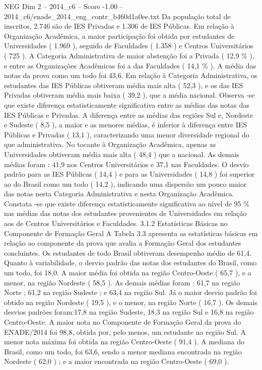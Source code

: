 \begin{textsample}{NEG Dim 2 – 2014\_c6 – Score -1.00 – 2014\_c6/enade\_2014\_eng\_contr\_b460d1a0ee.txt}
Da população total de inscritos, 2.746 são de IES Privadas e 1.306 de IES Públicas.
Em relação à Organização Acadêmica, a maior participação foi obtida por estudantes de Universidades ( 1.969 ), seguido de Faculdades ( 1.358 ) e Centros Universitários ( 725 ).
A Categoria Administrativa de maior abstenção foi a Privada ( 12,9 \% ), e entre as Organizações Acadêmicas foi a das Faculdades ( 14,1 \% ).
A média das notas da prova como um todo foi 43,6.
Em relação à Categoria Administrativa, os estudantes das IES Públicas obtiveram média mais alta ( 52,3 ), e os das IES Privadas obtiveram média mais baixa ( 39,2 ), que a média nacional.
Observa -se que existe diferença estatisticamente significativa entre as médias das notas das IES Públicas e Privadas.
A diferença entre as médias das regiões Sul e, Nordeste e Sudeste ( 8,5 ), a maior e as menores médias, é inferior à diferença entre IES Públicas e Privadas ( 13,1 ), caracterizando uma menor diversidade regional do que administrativa.
No tocante à Organização Acadêmica, apenas as Universidades obtiveram média mais alta ( 48,4 ) que a nacional.
As demais médias foram : 41,9 nos Centros Universitários e 37,1 nas Faculdades.
O desvio padrão para as IES Públicas ( 14,4 ) e para as Universidades ( 14,8 ) foi superior ao do Brasil como um todo ( 14,2 ), indicando uma dispersão um pouco maior das notas nesta Categoria Administrativa e nesta Organização Acadêmica.
Constata -se que existe diferença estatisticamente significativa ao nível de 95 \% nas médias das notas dos estudantes provenientes de Universidades em relação aos de Centros Universitários e Faculdades. 3.1.2 Estatísticas Básicas no Componente de Formação Geral A Tabela 3.3 apresenta as estatísticas básicas em relação ao componente da prova que avalia a Formação Geral dos estudantes concluintes.
Os estudantes de todo Brasil obtiveram desempenho médio de 61,4.
Quanto à variabilidade, o desvio padrão das notas dos estudantes do Brasil, como um todo, foi 18,0.
A maior média foi obtida na região Centro-Oeste ( 65,7 ), e a menor, na região Nordeste ( 58,5 ).
As demais médias foram : 61,7 na região Norte ; 61,2 na região Sudeste ; e 63,4 na região Sul.
Já o maior desvio padrão foi obtido na região Nordeste ( 19,5 ), e o menor, na região Norte ( 16,7 ).
Os demais desvios padrões foram:17,8 na região Sudeste, 18,3 na região Sul e 16,8 na região Centro-Oeste.
A maior nota no Componente de Formação Geral da prova do ENADE/2014 foi 98,8, obtida por, pelo menos, um estudante na região Sul.
A menor nota máxima foi obtida na região Centro-Oeste ( 91,4 ).
A mediana do Brasil, como um todo, foi 63,6, sendo a menor mediana encontrada na região Nordeste ( 62,0 ) ; e a maior encontrada na região Centro-Oeste ( 69,0 ).

\end{textsample}
